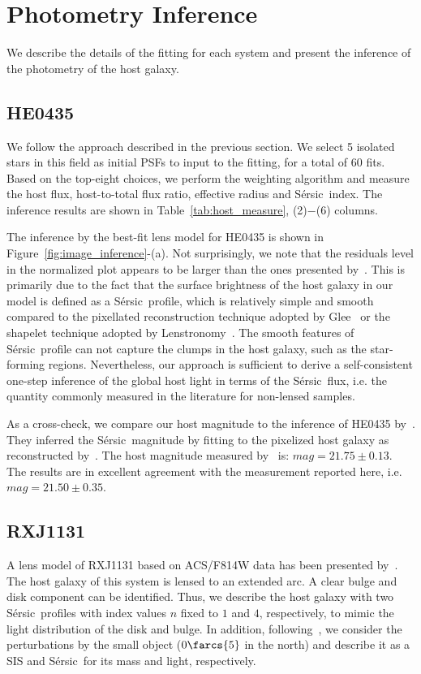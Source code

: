 \documentclass[fleqn,usenatbib]{mnras}
\newcommand{\sersic}{S\'ersic}
\newcommand{\lenstronomy}{{\sc Lenstronomy}}
\begin{document}
{\color{blue}
\section{Photometry Inference}\label{sec:photometry}
We describe the details of the fitting for each system and present the inference of the photometry of the host galaxy.

\subsection{HE0435}\label{subsec:HE0435}
We follow the approach described in the previous section. We select 5 isolated stars in this field as initial PSFs to input to the fitting, for a total of 60 fits. Based on the top-eight choices, we perform the weighting algorithm and measure the host flux, host-to-total flux ratio, effective radius and \sersic\ index. The inference results are shown in Table~\ref{tab:host_measure}, (2)$-$(6) columns.

The inference by the best-fit lens model for HE0435 is shown in Figure~\ref{fig:image_inference}-(a). Not surprisingly, we note that the residuals level in the normalized plot appears to be larger than the ones presented by~\citet{Wong2017}. This is primarily due to the fact that the surface brightness of the host galaxy in our model is defined as a \sersic\ profile, which is relatively simple and smooth compared to the pixellated reconstruction technique adopted by {\sc Glee}~\citep{Suy++06, Halk2008, S+H10, Suyu2012} or the shapelet technique adopted by \lenstronomy~\citep{Birrer2015}. The smooth features of \sersic\ profile can not capture the clumps in the host galaxy, such as the star-forming regions. Nevertheless, our approach is sufficient to derive a self-consistent one-step inference of the global host light in terms of the \sersic\ flux, i.e. the quantity commonly measured in the literature for non-lensed samples. 

As a cross-check, we compare our host magnitude to the inference of HE0435 by~\citet{Ding2017b}. They inferred the \sersic\ magnitude by fitting to the pixelized host galaxy as reconstructed by~\citet{Wong2017}. The host magnitude measured by~\citet{Ding2017b} is: $mag = 21.75 \pm 0.13$. %
The results are in excellent agreement with the measurement reported here, i.e. $mag = 21.50 \pm 0.35$.

\subsection{RXJ1131}
A lens model of RXJ1131 based on ACS/F814W data has been presented by~\citet{Suyu2013}. The host galaxy of this system is lensed to an extended arc. A clear bulge and disk component can be identified. Thus, we describe the host galaxy with two \sersic\ profiles with index values $n$ fixed to $1$ and $4$, respectively, to mimic the light distribution of the disk and bulge. In addition, following~\citet{Suyu2013}, we consider the perturbations by the small object ($0\farcs{5}$ in the north) and describe it as a SIS and \sersic\ for its mass and light, respectively.

}
\end{document}
